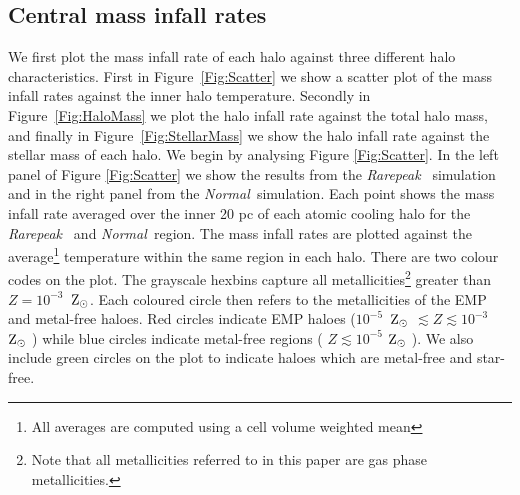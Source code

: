 \documentclass[graphics, twocolumn, usenatbib]{mn2e}
\newcommand{\zsolar} {$\rm{Z_{\odot}}~$}
\newcommand{\zsolarc} {$\rm{Z_{\odot}}$}
\newcommand{\rarepeak} {\textit{Rarepeak~}}
\newcommand{\normal} {\textit{Normal~}}
\begin{document}

\subsection{Central mass infall rates}

\indent We first plot the mass infall rate of each halo against three different halo
characteristics. First in Figure~\ref{Fig:Scatter} we show a scatter plot of the mass infall rates
against the inner halo temperature. Secondly in Figure~\ref{Fig:HaloMass} we plot the halo infall
rate against the total halo mass, and finally in Figure~\ref{Fig:StellarMass} we show the halo
infall rate against the stellar mass of each halo. We begin by analysing Figure \ref{Fig:Scatter}. 
In the left panel of Figure \ref{Fig:Scatter} we show the results from the \rarepeak
simulation and in the right panel from the \normal simulation. Each point shows the mass
infall rate averaged over the inner 20 pc of each atomic cooling halo for the \rarepeak
and \normal region. The mass infall rates are plotted against the average\footnote{All
  averages are computed using a cell volume weighted mean} temperature within
the same region in each halo. There are two colour codes on the plot. The grayscale
hexbins capture all metallicities\footnote{Note that all metallicities
  referred to in this paper are gas phase metallicities.}
greater than $Z = 10^{-3}$~\zsolarc. Each coloured circle then refers to
the metallicities of the EMP and metal-free haloes. Red circles indicate EMP haloes
 ($10^{-5}$~\zsolar $ \lesssim Z \lesssim 10^{-3}$~\zsolar )
while blue circles indicate metal-free regions  ( $Z \lesssim 10^{-5}$ \zsolar ). We also
include green circles on the plot to indicate haloes which are metal-free and star-free. 
\end{document}
